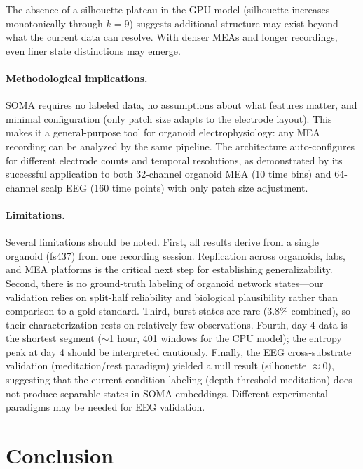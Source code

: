 \documentclass{article}
\begin{document}
The absence of a silhouette plateau in the GPU model (silhouette increases monotonically through $k=9$) suggests additional structure may exist beyond what the current data can resolve. With denser MEAs and longer recordings, even finer state distinctions may emerge.

\paragraph{Methodological implications.}
SOMA requires no labeled data, no assumptions about what features matter, and minimal configuration (only patch size adapts to the electrode layout). This makes it a general-purpose tool for organoid electrophysiology: any MEA recording can be analyzed by the same pipeline. The architecture auto-configures for different electrode counts and temporal resolutions, as demonstrated by its successful application to both 32-channel organoid MEA (10 time bins) and 64-channel scalp EEG (160 time points) with only patch size adjustment.

\paragraph{Limitations.}
Several limitations should be noted. First, all results derive from a single organoid (fs437) from one recording session. Replication across organoids, labs, and MEA platforms is the critical next step for establishing generalizability. Second, there is no ground-truth labeling of organoid network states---our validation relies on split-half reliability and biological plausibility rather than comparison to a gold standard. Third, burst states are rare (3.8\% combined), so their characterization rests on relatively few observations. Fourth, day 4 data is the shortest segment ($\sim$1 hour, 401 windows for the CPU model); the entropy peak at day 4 should be interpreted cautiously. Finally, the EEG cross-substrate validation (meditation/rest paradigm) yielded a null result (silhouette $\approx 0$), suggesting that the current condition labeling (depth-threshold meditation) does not produce separable states in SOMA embeddings. Different experimental paradigms may be needed for EEG validation.

\section{Conclusion}
\end{document}
